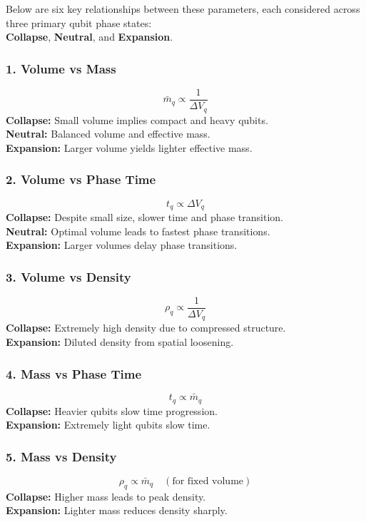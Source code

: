 \documentclass[12pt]{report} %
\begin{document}
Below are six key relationships between these parameters, each considered across three primary qubit phase states:\\
\textbf{Collapse}, 
\textbf{Neutral}, and 
\textbf{Expansion}.

\subsubsection*{1. Volume vs Mass}
\[
\bar{m}_q \propto \frac{1}{\Delta V_q}
\]
\textbf{Collapse:} Small volume implies compact and heavy qubits. \\ 
\textbf{Neutral:} Balanced volume and effective mass.  \\
\textbf{Expansion:} Larger volume yields lighter effective mass.\\

\subsubsection*{2. Volume vs Phase Time}
\[
t_q \propto \Delta V_q
\]
\textbf{Collapse:} Despite small size, slower time and phase transition.\\  
\textbf{Neutral:} Optimal volume leads to fastest phase transitions.  \\
\textbf{Expansion:} Larger volumes delay phase transitions.\\

\subsubsection*{3. Volume vs Density}
\[
\rho_q \propto \frac{1}{\Delta V_q}
\]
\textbf{Collapse:} Extremely high density due to compressed structure.  \\
\textbf{Expansion:} Diluted density from spatial loosening.\\

\subsubsection*{4. Mass vs Phase Time}
\[
t_q \propto \bar{m}_q
\]
\textbf{Collapse:} Heavier qubits slow time progression.  \\
\textbf{Expansion:} Extremely light qubits slow time.\\

\subsubsection*{5. Mass vs Density}
\[
\rho_q \propto \bar{m}_q \quad (\text{for fixed volume})
\]
\textbf{Collapse:} Higher mass leads to peak density.  \\
\textbf{Expansion:} Lighter mass reduces density sharply.\\
\end{document}
